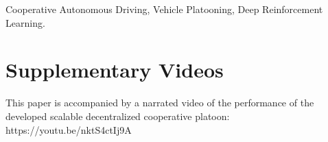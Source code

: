 \documentclass[lettersize,journal]{IEEEtran}
\begin{document}
\begin{IEEEkeywords}
Cooperative Autonomous Driving, Vehicle Platooning, Deep Reinforcement Learning.
\end{IEEEkeywords}

\section*{Supplementary Videos}
This paper is accompanied by a narrated video of the performance of the developed scalable decentralized cooperative platoon: https://youtu.be/nktS4ctIj9A








\end{document}
